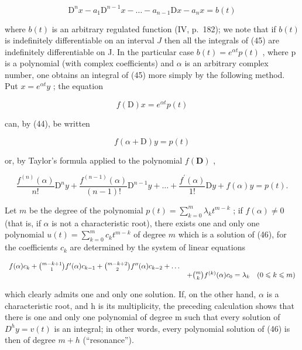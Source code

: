 \[
\mathrm{D} ^ {n} x - a _ {1} \mathrm{D} ^ {n - 1} x - \dots - a _ {n - 1} \mathrm{D} x - a _ {n} x = b (t)\tag{45}
\]

where \(b(t)\) is an arbitrary regulated function (IV, p.~182); we note that if \(b(t)\) is indefinitely differentiable on an interval \(J\) then all the integrals of (45) are indefinitely differentiable on J. In the particular case \(b(t) = e^{\alpha t} p(t)\) , where p is a polynomial (with complex coefficients) and \(\alpha\) is an arbitrary complex number, one obtains an integral of (45) more simply by the following method. Put \(x = e^{\alpha t} y\) ; the equation

\[
f (\mathrm{D}) x = e ^ {\alpha t} p (t)
\]

can, by (44), be written

\[
f (\alpha + \mathrm{D}) y = p (t)
\]

or, by Taylor's formula applied to the polynomial \(f(\mathbf{D})\) ,

\[
\frac {f ^ {(n)} (\alpha)}{n !} \mathrm{D} ^ {n} y + \frac {f ^ {(n - 1)} (\alpha)}{(n - 1) !} \mathrm{D} ^ {n - 1} y + \dots + \frac {f ^ {\prime} (\alpha)}{1 !} \mathrm{D} y + f (\alpha) y = p (t).\tag{46}
\]

Let \(m\) be the degree of the polynomial \(p(t) = \sum_{k=0}^{m} \lambda_k t^{m-k}\) ; if \(f(\alpha) \neq 0\) (that is, if \(\alpha\) is not a characteristic root), there exists one and only one polynomial \(u(t) = \sum_{k=0}^{m} c_k t^{m-k}\) of degree \(m\) which is a solution of (46), for the coefficients \(c_k\) are determined by the system of linear equations

\[
\begin{array}{r l} f (\alpha) c _ {k} + \binom {m - k + 1} {1} f ^ {\prime} (\alpha) c _ {k - 1} + \binom {m - k + 2} {2} f ^ {\prime \prime} (\alpha) c _ {k - 2} + \dots \\ & + \binom {m} {k} f ^ {(k)} (\alpha) c _ {0} = \lambda_ {k} \quad (0 \leqslant k \leqslant m) \end{array}
\]

which clearly admits one and only one solution. If, on the other hand, \(\alpha\) is a characteristic root, and h is its multiplicity, the preceding calculation shows that there is one and only one polynomial of degree m such that every solution of \(D^{h}y = v(t)\) is an integral; in other words, every polynomial solution of (46) is then of degree \(m + h\) (``resonance'').


